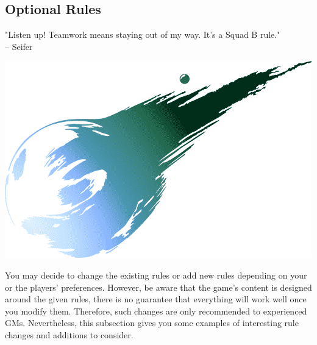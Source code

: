 \subsection*{\hypertarget{optrules}{Optional Rules}}
%
%
"Listen up! Teamwork means staying out of my way. It's a Squad B rule."\\
\indent -- Seifer 
%
\begin{center} \includegraphics[width=\columnwidth]{./art/images/ff7.png} \end{center}
%
\vfill
%
You may decide to change the existing rules or add new rules depending on your or the players' preferences.
However, be aware that the game's content is designed around the given rules, there is no guarantee that everything will work well once you modify them.
Therefore, such changes are only recommended to experienced GMs.
Nevertheless, this subsection gives you some examples of interesting rule changes and additions to consider. 

\vfill

